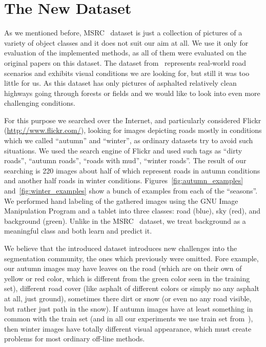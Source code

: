 \section{The New Dataset}

As we mentioned before, MSRC~\cite{MSRC} dataset is just a collection of pictures of a variety of object classes and it does not
suit our aim at all. We use it only for evaluation of the implemented methods, as all of them were evaluated on the
original papers on this dataset. The dataset from~\cite{Wojek2008} represents real-world road scenarios and exhibits visual
conditions we are looking for, but still it was too little for us. As this dataset has only pictures of asphalted 
relatively clean highways going through forests or fields and we would like to look into even more challenging conditions.

For this purpose we searched over the Internet, and particularly considered Flickr\textsuperscript{\textregistered}
(\url{http://www.flickr.com/}), looking for images depicting roads mostly in conditions which we called ``autumn'' and
``winter'', as ordinary datasets try to avoid such situations. We used the search engine of Flickr\textsuperscript{\textregistered}
and used such tags as ``dirty roads'', ``autumn roads'', ``roads with mud'', ``winter roads''.
The result of our searching is 220 images about half of which
represent roads in autumn conditions and another half roads in winter conditions. Figures~\ref{fig:autumn_examples} 
and~\ref{fig:winter_examples} show a bunch of examples from each of the ``seasons''. 
We performed hand labeling of the gathered images using the GNU Image Manipulation Program and a tablet into three classes: 
road (blue), sky (red), and background (green).
Unlike in the MSRC~\cite{MSRC} dataset, we treat background as a meaningful class and both learn and
predict it.

We believe that the introduced dataset introduces new challenges into the segmentation community, the ones which previously
were omitted. Fore example, our autumn images may have leaves on the road (which are on their own of yellow or red color,
which is different from the green color seen in the training set), different road cover (like asphalt of different colors
or simply no any asphalt at all, just ground), sometimes there dirt or snow (or even no any road visible, but rather just
path in the snow). If autumn images have at least something in common with the train set (and in all our experiments we use
train set from~\cite{Wojek2008}), then winter images have totally different visual appearance, which must create problems
for most ordinary off-line methods.

